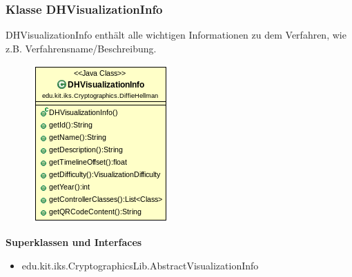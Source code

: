 \documentclass{article}
\begin{document}
\subsubsection{Klasse DHVisualizationInfo}
      DHVisualizationInfo enthält alle wichtigen Informationen zu dem Verfahren, wie z.B. Verfahrensname/Beschreibung.
      \begin{figure}[H]
        \centering
        \includegraphics[width=\textwidth]{resources/edu-kit-iks-Cryptographics-DiffieHellman-DHVisualizationInfo}
      \end{figure}

      \textbf{Superklassen und Interfaces}
      \begin{itemize}
        \item edu.kit.iks.CryptographicsLib.AbstractVisualizationInfo
      \end{itemize}
      
\end{document}
